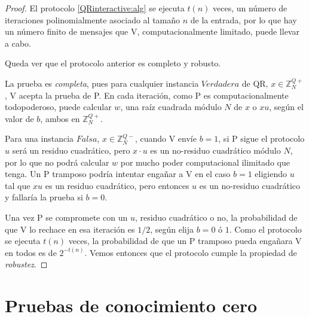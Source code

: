\begin{proof}
	
	El protocolo \ref{QRinteractive:alg} se ejecuta $t(n)$ veces, un número de iteraciones polinomialmente asociado al tamaño $n$ de la entrada, por lo que hay un número finito de mensajes que V, computacionalmente limitado, puede llevar a cabo. 
		
	Queda ver que el protocolo anterior es completo y robusto.
	
	La prueba es \textit{completa}, pues para cualquier instancia $Verdadera$ de QR, $x \in \mathbb{Z}^{Q+}_N$, V acepta la prueba de P. En cada iteración, como P es computacionalmente todopoderoso, puede calcular $w$, una raíz cuadrada módulo $N$ de $x$ o $xu$, según el valor de $b$, ambos en $\mathbb{Z}^{Q+}_N$.
	
	Para una instancia $Falsa$, $x \in \mathbb{Z}^{Q-}_N$, cuando V envíe $b=1$, si P sigue el protocolo $u$ será un residuo cuadrático, pero $x\cdot u$ es un no-residuo cuadrático módulo $N$, por lo que no podrá calcular $w$ por mucho poder computacional ilimitado que tenga. Un P tramposo podría intentar engañar a V en el caso $b = 1$ eligiendo $u$ tal que $xu$ es un residuo cuadrático, pero entonces $u$ es un no-residuo cuadrático y fallaría la prueba si $b=0$.
	
	Una vez P se compromete con un $u$, residuo cuadrático o no, la probabilidad de que V lo rechace en esa iteración es $1/2$, según elija $b=0$ ó $1$. Como el protocolo se ejecuta $t(n)$ veces, la probabilidad de que un P tramposo pueda engañara V en todos es de $2^{-t(n)}$. Vemos entonces que el protocolo cumple la propiedad de \textit{robustez}.
\end{proof}




\section{Pruebas de conocimiento cero}

